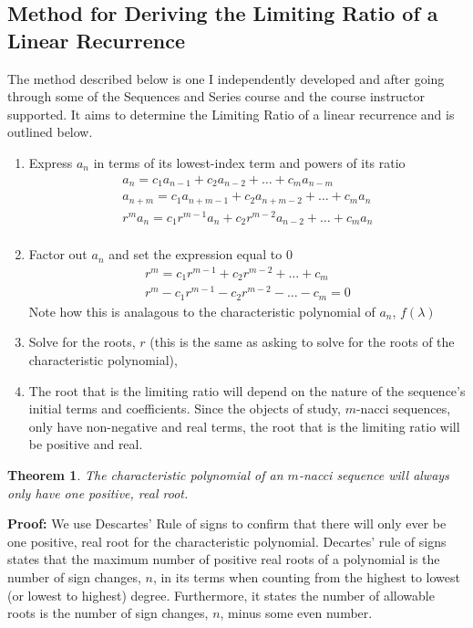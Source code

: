 \documentclass[11pt]{article}
\newtheorem{theorem}{Theorem}[section]
\begin{document}
\subsection{Method for Deriving the Limiting Ratio of a Linear Recurrence}
The method described below is one I independently developed and after going through some of the Sequences and Series course and the course instructor supported. It aims to determine the Limiting Ratio of a linear recurrence and is outlined below.
\begin{enumerate}
    \item Express $a_n$ in terms of its lowest-index term and powers of its ratio 
    \begin{align*}
        a_n=c_1a_{n-1}+c_2a_{n-2}+\dots +c_ma_{n-m} \\
        a_{n+m}=c_1a_{n+m-1}+c_2a_{n+m-2}+\dots +c_ma_{n} \\
        r^{m}a_{n}=c_1r^{m-1}a_{n}+c_2r^{m-2}a_{n-2}+\dots +c_ma_{n} \\
    \end{align*}
    \item Factor out $a_n$ and set the expression equal to 0
    \begin{align*}
        r^{m}=c_1r^{m-1}+c_2r^{m-2}+\dots +c_m \\
        r^{m}-c_1r^{m-1}-c_2r^{m-2}-\dots -c_m=0
    \end{align*}
    Note how this is analagous to the characteristic polynomial of $a_n$, \(f(\lambda)\)
    \item Solve for the roots, $r$ (this is the same as asking to solve for the roots of the characteristic polynomial), 
    \item The root that is the limiting ratio will depend on the nature of the sequence's initial terms and coefficients. Since the objects of study, \(m\)-nacci sequences, only have non-negative and real terms, the root that is the limiting ratio will be positive and real. 
\end{enumerate}
\begin{theorem}
    The characteristic polynomial of an \(m\)-nacci sequence will always only have one positive, real root.
\end{theorem}
\textbf{Proof:} We use Descartes' Rule of signs to confirm that there will only ever be one positive, real root for the characteristic polynomial. Decartes' rule of signs states that the maximum number of positive real roots of a polynomial is the number of sign changes, \(n\), in its terms when counting from the highest to lowest (or lowest to highest) degree. Furthermore, it states the number of allowable roots is the number of sign changes, \(n\), minus some even number. 
\end{document}
